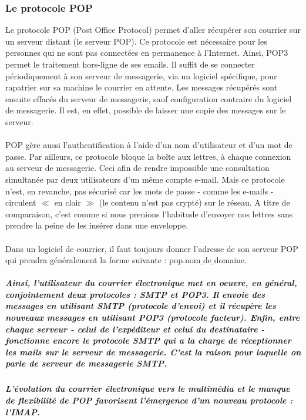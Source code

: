 \documentclass[french]{report}
\begin{document}
\begin{titlepage}
\subsubsection{\LARGE Le protocole POP }
\LARGE Le protocole POP (Post Office Protocol) permet d'aller récupérer son courrier sur un serveur distant (le serveur POP). Ce protocole est nécessaire pour les personnes qui ne sont pas connectées en permanence à l'Internet. Ainsi, POP3 permet le traitement hors-ligne de ses emails. Il suffit de se connecter périodiquement à son serveur de messagerie, via un logiciel spécifique, pour rapatrier sur sa machine le courrier en attente. Les messages récupérés sont ensuite effacés du serveur de messagerie, sauf configuration contraire du logiciel de messagerie. Il est, en effet, possible de laisser une copie des messages sur le serveur.\\ \\
POP gère aussi l'authentification à l'aide d'un nom d'utilisateur et d'un mot de passe. Par ailleurs, ce protocole bloque la boîte aux lettres, à chaque connexion au serveur de messagerie. Ceci afin de rendre impossible une consultation simultanée par deux utilisateurs d'un même compte e-mail.
Mais ce protocole n'est, en revanche, pas sécurisé car les mots de passe - comme les e-mails - circulent $\ll$ en clair $\gg$ (le contenu n'est pas crypté) sur le réseau. A titre de comparaison, c'est comme si nous prenions l'habitude d'envoyer nos lettres sans prendre la peine de les insérer dans une enveloppe.\\ \\
Dans un logiciel de courrier, il faut toujours donner l'adresse de son serveur POP qui prendra généralement la forme suivante : pop.nom$\_$de$\_$domaine.

\subparagraph{\LARGE Ainsi, l'utilisateur du courrier électronique met en oeuvre, en général, conjointement deux protocoles : SMTP et POP3. Il envoie des messages en utilisant SMTP (protocole d'envoi) et il récupère les nouveaux messages en utilisant POP3 (protocole facteur). Enfin, entre chaque serveur - celui de l'expéditeur et celui du destinataire - fonctionne encore le protocole SMTP qui a la charge de réceptionner les mails sur le serveur de messagerie. C'est la raison pour laquelle on parle de serveur de messagerie SMTP.}
\subparagraph{
\LARGE L'évolution du courrier électronique vers le multimédia et le manque de flexibilité de POP favorisent l'émergence d'un nouveau protocole : l'IMAP.}


\end{titlepage}
\end{document}
